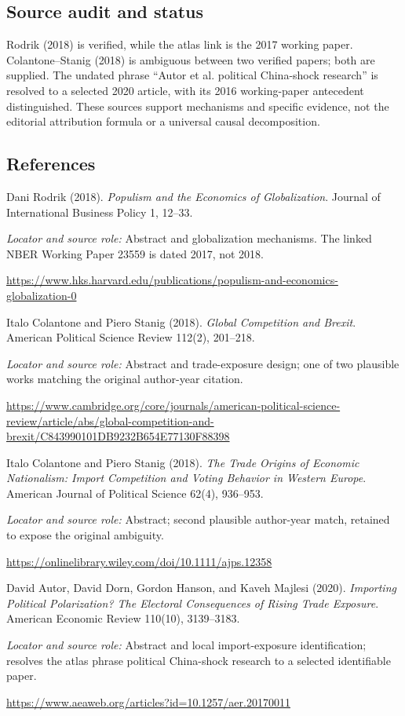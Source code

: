 \documentclass[11pt,a4paper]{article}
\begin{document}
\subsection*{Source audit and status}
Rodrik (2018) is verified, while the atlas link is the 2017 working paper. Colantone--Stanig (2018) is ambiguous between two verified papers; both are supplied. The undated phrase ``Autor et al. political China-shock research'' is resolved to a selected 2020 article, with its 2016 working-paper antecedent distinguished. These sources support mechanisms and specific evidence, not the editorial attribution formula or a universal causal decomposition.
\subsection*{References}
{\footnotesize\raggedright
\begin{enumerate}[label={\textbf{[S\arabic*]}},leftmargin=3em]
\item Dani Rodrik (2018). \emph{Populism and the Economics of Globalization}. Journal of International Business Policy 1, 12--33.\par
\textit{Locator and source role:} Abstract and globalization mechanisms. The linked NBER Working Paper 23559 is dated 2017, not 2018.\par
\url{https://www.hks.harvard.edu/publications/populism-and-economics-globalization-0}
\item Italo Colantone and Piero Stanig (2018). \emph{Global Competition and Brexit}. American Political Science Review 112(2), 201--218.\par
\textit{Locator and source role:} Abstract and trade-exposure design; one of two plausible works matching the original author-year citation.\par
\url{https://www.cambridge.org/core/journals/american-political-science-review/article/abs/global-competition-and-brexit/C843990101DB9232B654E77130F88398}
\item Italo Colantone and Piero Stanig (2018). \emph{The Trade Origins of Economic Nationalism: Import Competition and Voting Behavior in Western Europe}. American Journal of Political Science 62(4), 936--953.\par
\textit{Locator and source role:} Abstract; second plausible author-year match, retained to expose the original ambiguity.\par
\url{https://onlinelibrary.wiley.com/doi/10.1111/ajps.12358}
\item David Autor, David Dorn, Gordon Hanson, and Kaveh Majlesi (2020). \emph{Importing Political Polarization? The Electoral Consequences of Rising Trade Exposure}. American Economic Review 110(10), 3139--3183.\par
\textit{Locator and source role:} Abstract and local import-exposure identification; resolves the atlas phrase political China-shock research to a selected identifiable paper.\par
\url{https://www.aeaweb.org/articles?id=10.1257/aer.20170011}
\end{enumerate}
}
\end{document}
